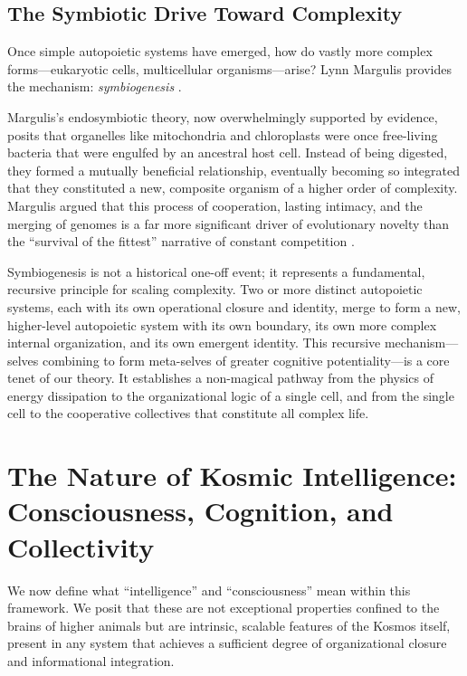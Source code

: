 \documentclass[12pt,a4paper]{article}
\begin{document}
\subsection{The Symbiotic Drive Toward Complexity}
\label{sec:symbiogenesis}

Once simple autopoietic systems have emerged, how do vastly more complex
forms---eukaryotic cells, multicellular organisms---arise?  Lynn Margulis
provides the mechanism: \emph{symbiogenesis} \citep{margulis1998,margulis1970}.

Margulis's endosymbiotic theory, now overwhelmingly supported by evidence,
posits that organelles like mitochondria and chloroplasts were once
free-living bacteria that were engulfed by an ancestral host cell.  Instead
of being digested, they formed a mutually beneficial relationship,
eventually becoming so integrated that they constituted a new, composite
organism of a higher order of complexity.  Margulis argued that this
process of cooperation, lasting intimacy, and the merging of genomes is a
far more significant driver of evolutionary novelty than the ``survival of
the fittest'' narrative of constant competition \citep{margulis1998}.

Symbiogenesis is not a historical one-off event; it represents a
fundamental, recursive principle for scaling complexity.  Two or more
distinct autopoietic systems, each with its own operational closure and
identity, merge to form a new, higher-level autopoietic system with its
own boundary, its own more complex internal organization, and its own
emergent identity.  This recursive mechanism---selves combining to form
meta-selves of greater cognitive potentiality---is a core tenet of our
theory.  It establishes a non-magical pathway from the physics of energy
dissipation to the organizational logic of a single cell, and from the
single cell to the cooperative collectives that constitute all complex
life.


\section{The Nature of Kosmic Intelligence: Consciousness, Cognition, and Collectivity}
\label{sec:intelligence}

We now define what ``intelligence'' and ``consciousness'' mean within this
framework.  We posit that these are not exceptional properties confined to
the brains of higher animals but are intrinsic, scalable features of the
Kosmos itself, present in any system that achieves a sufficient degree of
organizational closure and informational integration.
\end{document}
